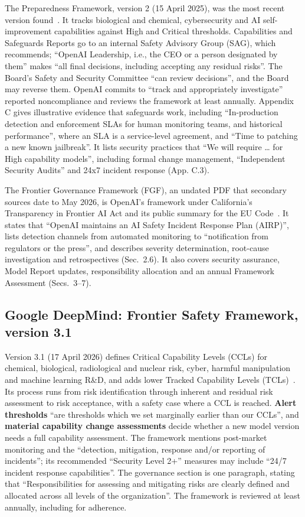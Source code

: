 \documentclass[11pt]{article}
\begin{document}
The Preparedness Framework, version 2 (15 April 2025), was the most recent version found~\cite{openai2025pf}. It tracks biological and chemical, cybersecurity and AI self-improvement capabilities against High and Critical thresholds. Capabilities and Safeguards Reports go to an internal Safety Advisory Group (SAG), which recommends; ``OpenAI Leadership, i.e., the CEO or a person designated by them'' makes ``all final decisions, including accepting any residual risks''. The Board's Safety and Security Committee ``can review decisions'', and the Board may reverse them. OpenAI commits to ``track and appropriately investigate'' reported noncompliance and reviews the framework at least annually. Appendix C gives illustrative evidence that safeguards work, including ``In-production detection and enforcement SLAs for human monitoring teams, and historical performance'', where an SLA is a service-level agreement, and ``Time to patching a new known jailbreak''. It lists security practices that ``We will require \ldots{} for High capability models'', including formal change management, ``Independent Security Audits'' and 24x7 incident response (App. C.3).

The Frontier Governance Framework (FGF), an undated PDF that secondary sources date to May 2026, is OpenAI's framework under California's Transparency in Frontier AI Act and its public summary for the EU Code~\cite{openaiFGF}. It states that ``OpenAI maintains an AI Safety Incident Response Plan (AIRP)'', lists detection channels from automated monitoring to ``notification from regulators or the press'', and describes severity determination, root-cause investigation and retrospectives (Sec.~2.6). It also covers security assurance, Model Report updates, responsibility allocation and an annual Framework Assessment (Secs.~3--7).

\subsection{Google DeepMind: Frontier Safety Framework, version 3.1}\label{sec:gdm}

Version 3.1 (17 April 2026) defines Critical Capability Levels (CCLs) for chemical, biological, radiological and nuclear risk, cyber, harmful manipulation and machine learning R\&D, and adds lower Tracked Capability Levels (TCLs)~\cite{gdm2026fsf}. Its process runs from risk identification through inherent and residual risk assessment to risk acceptance, with a safety case where a CCL is reached. \textbf{Alert thresholds} ``are thresholds which we set marginally earlier than our CCLs'', and \textbf{material capability change assessments} decide whether a new model version needs a full capability assessment. The framework mentions post-market monitoring and the ``detection, mitigation, response and/or reporting of incidents''; its recommended ``Security Level 2+'' measures may include ``24/7 incident response capabilities''. The governance section is one paragraph, stating that ``Responsibilities for assessing and mitigating risks are clearly defined and allocated across all levels of the organization''. The framework is reviewed at least annually, including for adherence.
\end{document}
